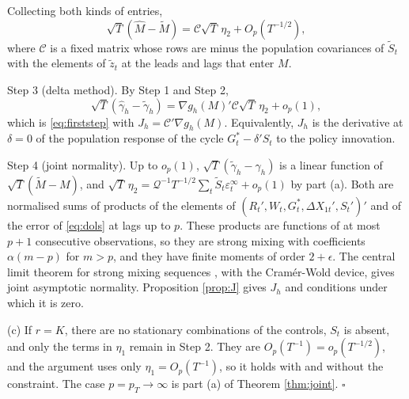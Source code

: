 \documentclass[12pt,a4paper]{article}
\theoremstyle{definition}
\theoremstyle{definition}\newtheorem{example}{Example}
\theoremstyle{definition}\newtheorem{definition}{Definition}
\begin{document}
Collecting both kinds of entries,
\[
\sqrt{T}(\hat M-\tilde M)=\mathcal C\sqrt{T}\,\eta_2+O_p(T^{-1/2}),
\]
where $\mathcal C$ is a fixed matrix whose rows are minus the population covariances of $\tilde S_t$ with the elements of $\tilde z_t$ at the leads and lags that enter $M$.

Step 3 (delta method). By Step 1 and Step 2,
\[
\sqrt{T}(\hat\gamma_h-\tilde\gamma_h)=\nabla g_h(M)'\mathcal C\sqrt{T}\,\eta_2+o_p(1),
\]
which is \eqref{eq:firststep} with $J_h=\mathcal C'\nabla g_h(M)$. Equivalently, $J_h$ is the derivative at $\delta=0$ of the population response of the cycle $G^\ast_t-\delta'S_t$ to the policy innovation.

Step 4 (joint normality). Up to $o_p(1)$, $\sqrt{T}(\tilde\gamma_h-\gamma_h)$ is a linear function of $\sqrt{T}(\tilde M-M)$, and $\sqrt{T}\,\eta_2=\mathcal Q^{-1}T^{-1/2}\sum_t\tilde S_t\varepsilon^\infty_t+o_p(1)$ by part (a). Both are normalised sums of products of the elements of $(R_t',W_t,G^\ast_t,\Delta X_{1t}',S_t')'$ and of the error of \eqref{eq:dols} at lags up to $p$. These products are functions of at most $p+1$ consecutive observations, so they are strong mixing with coefficients $\alpha(m-p)$ for $m>p$, and they have finite moments of order $2+\epsilon$. The central limit theorem for strong mixing sequences \citep{Herrndorf1984}, with the Cram\'er-Wold device, gives joint asymptotic normality. Proposition \ref{prop:J} gives $J_h$ and conditions under which it is zero.

(c) If $r=K$, there are no stationary combinations of the controls, $S_t$ is absent, and only the terms in $\eta_1$ remain in Step 2. They are $O_p(T^{-1})=o_p(T^{-1/2})$, and the argument uses only $\eta_1=O_p(T^{-1})$, so it holds with and without the constraint. The case $p=p_T\to\infty$ is part (a) of Theorem \ref{thm:joint}. $\square$
\end{document}
